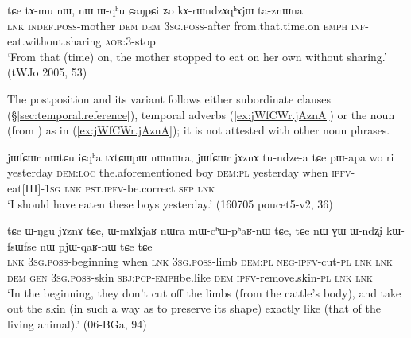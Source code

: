  \begin{exe}
\ex \label{ex:Wqhu.CaNpCi}
\gll  tɕe tɤ-mu nɯ, nɯ ɯ-qʰu ɕaŋpɕi ʑo kɤ-rɯndzɤqʰɤjɯ ta-znɯna \\
\textsc{lnk} \textsc{indef}.\textsc{poss}-mother \textsc{dem} \textsc{dem} \textsc{3sg}.\textsc{poss}-after from.that.time.on \textsc{emph} \textsc{inf}-eat.without.sharing \textsc{aor}:3\flobv{}-stop \\
\glt `From that (time) on, the mother stopped to eat on her own without sharing.' (tWJo 2005, 53) 
\end{exe}

The postposition  and its variant  follows either subordinate clauses (§\ref{sec:temporal.reference}), temporal adverbs (\ref{ex:jWfCWr.jAznA}) or the noun  (from ) as in (\ref{ex:jWfCWr.jAznA}); it is not attested with other noun phrases.

\begin{exe}
\ex \label{ex:jWfCWr.jAznA}
\gll  jɯfɕɯr nɯtɕu iɕqʰa tɤtɕɯpɯ nɯnɯra, jɯfɕɯr jɤznɤ tu-ndze-a tɕe pɯ-apa wo ri \\ 
yesterday \textsc{dem}:\textsc{loc} the.aforementioned boy \textsc{dem}:\textsc{pl} yesterday when \textsc{ipfv}-eat[III]-\textsc{1sg}  \textsc{lnk} \textsc{pst}.\textsc{ipfv}-be.correct \textsc{sfp} \textsc{lnk} \\
\glt  `I should have eaten these boys yesterday.' (160705 poucet5-v2, 36)
\end{exe}

 \begin{exe}
\ex \label{ex:WNgu.jAznA}
\gll  tɕe ɯ-ŋgu jɤznɤ tɕe, ɯ-mɤlɤjaʁ nɯra mɯ-cʰɯ-pʰaʁ-nɯ tɕe,  tɕe nɯ ɣɯ ɯ-ndʐi kɯ-fsɯ\redp{}fse nɯ pjɯ-qaʁ-nɯ tɕe tɕe \\
\textsc{lnk} \textsc{3sg}.\textsc{poss}-beginning when \textsc{lnk} \textsc{3sg}.\textsc{poss}-limb \textsc{dem}:\textsc{pl} \textsc{neg}-\textsc{ipfv}-cut-\textsc{pl} \textsc{lnk} \textsc{lnk} \textsc{dem} \textsc{gen} \textsc{3sg}.\textsc{poss}-skin \textsc{sbj}:\textsc{pcp}-\textsc{emph}\redp{}be.like \textsc{dem} \textsc{ipfv}-remove.skin-\textsc{pl} \textsc{lnk} \textsc{lnk} \\
\glt `In the beginning, they don't cut off the limbs (from the cattle's body), and take out the skin (in such a way as to preserve its shape) exactly like (that of the living animal).' (06-BGa, 94)
\end{exe}


